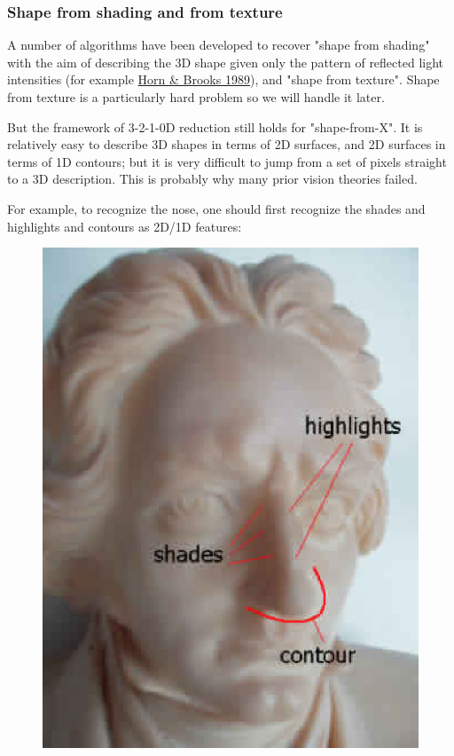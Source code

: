 \subsubsection{Shape from shading and from texture}

A number of algorithms have been developed to recover "shape from shading" with the aim of describing the 3D shape given only the pattern of reflected light intensities (for example \hyperlink{ref}{Horn \& Brooks 1989}), and "shape from texture". Shape from texture is a particularly hard problem so we will handle it later.

But  the framework of 3-2-1-0D reduction still holds for "shape-from-X". It is relatively easy to describe 3D shapes in terms of  2D surfaces, and 2D surfaces in terms of 1D contours; but it is very difficult to jump from a set of pixels straight to a 3D description. This is probably why many prior vision theories failed.

For example, to recognize the  nose, one should first recognize the shades and highlights and contours as 2D/1D features:

\begin{figure}[H]
\centering
\includegraphics[scale=0.7,bb=0 0 336 448]{BeethovenAnalysis.eps}
\end{figure}

